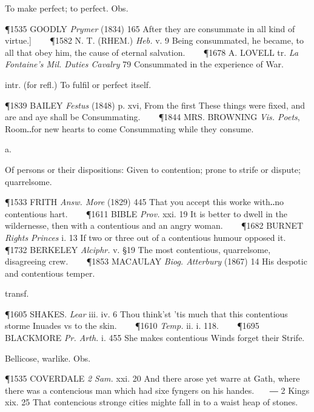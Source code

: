 \begin{description}[wide, labelwidth=!, labelindent=0pt]
\begin{myenumerate}
 To make perfect; to perfect. Obs.

\P 1535 GOODLY  \textit{Prymer} (1834) 165 After they are consummate in all kind of virtue.]    
\P 1582 N. T. (RHEM.)  \textit{Heb.} v. 9 Being consummated, he became, to all that obey him, the cause of eternal salvation.    
\P 1678 A. LOVELL tr. \textit{La Fontaine's Mil. Duties Cavalry} 79 Consummated in the experience of War.

 intr. (for refl.) To fulfil or perfect itself.

\P 1839 BAILEY  \textit{Festus} (1848) p. xvi, From the first These things were fixed, and are and aye shall be Consummating.    
\P 1844 MRS. BROWNING  \textit{Vis. Poets}, Room‥for new hearts to come Consummating while they consume.
\end{myenumerate}


 a.

\noindent {}

\vspace{-0.3cm}

\begin{myenumerate}

 Of persons or their dispositions: Given to contention; prone to strife or dispute; quarrelsome.

\P 1533 FRITH  \textit{Answ. More} (1829) 445 That you accept this worke with‥no contentious hart.    
\P 1611 BIBLE  \textit{Prov.} xxi. 19 It is better to dwell in the wildernesse, then with a contentious and an angry woman.    
\P 1682 BURNET  \textit{Rights Princes} i. 13 If two or three out of a contentious humour opposed it.    
\P 1732 BERKELEY  \textit{Alciphr.} v. §19 The most contentious, quarrelsome, disagreeing crew.    
\P 1853 MACAULAY  \textit{Biog. Atterbury} (1867) 14 His despotic and contentious temper.

 transf.

\P 1605 SHAKES.  \textit{Lear} iii. iv. 6 Thou think'st 'tis much that this contentious storme Inuades vs to the skin.    
\P 1610 \textit{Temp.} ii. i. 118.    
\P 1695 BLACKMORE  \textit{Pr. Arth.} i. 455 She makes contentious Winds forget their Strife.

 Bellicose, warlike. Obs.

\P 1535 COVERDALE  \textit{2 Sam.} xxi. 20 And there arose yet warre at Gath, where there was a contencious man which had sixe fyngers on his handes.    ― 2 Kings xix. 25 That contencious stronge cities mighte fall in to a waist heap of stones.


\end{myenumerate}
\end{description}
